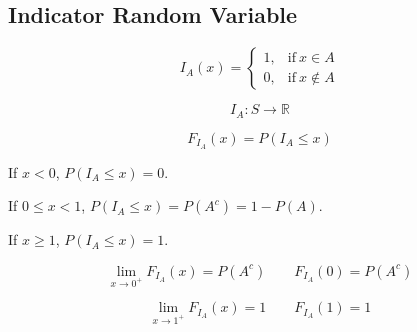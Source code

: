 \documentclass{article}
\begin{document}
\subsection{Indicator Random Variable}
\begin{equation*}
    I_A (x)=
    \begin{cases}
      1, & \text{if}\ x \in A \\
      0, & \text{if}\ x \notin A
    \end{cases}
\end{equation*}

$$I_A:S \to \mathbb{R}$$

$$ F_{I_{A}} (x)= P(I_A \leq x)$$

If $x < 0 $, $P(I_A \leq x)= 0$.

If $0 \leq x <1 $, $P(I_A \leq x)= P(A^c)=1-P(A)$.

If $x \geq 1 $, $P(I_A \leq x)= 1$.

$$ \lim_{x \to 0^+} F_{I_A}(x)= P(A^c) \qquad F_{I_A}(0)= P(A^c)$$

$$ \lim_{x \to 1^+} F_{I_A}(x)= 1 \qquad F_{I_A}(1)= 1$$
\end{document}
